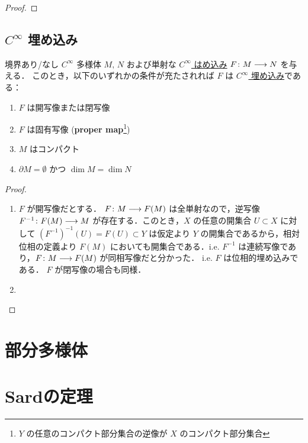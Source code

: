 \documentclass[TQFT_main]{subfiles}
\begin{document}
\begin{proof}
    
\end{proof}

\subsection{$C^\infty$ 埋め込み}

\begin{myprop}[label=prop:embedding-basic]{}
    境界あり/なし $C^\infty$ 多様体 $M,\, N$ および単射な \hyperref[def:submersion-smooth]{$C^\infty$ はめ込み} $F \colon M \longrightarrow N$ を与える．
    このとき，以下のいずれかの条件が充たされれば $F$ は \hyperref[def:submersion-smooth]{$C^\infty$ 埋め込み}である：
    \begin{enumerate}
        \item $F$ は開写像または閉写像
        \item $F$ は固有写像 (\textbf{proper map}\footnote{$Y$ の任意のコンパクト部分集合の逆像が $X$ のコンパクト部分集合})
        \item $M$ はコンパクト
        \item $\partial M = \emptyset$ かつ $\dim M = \dim N$
    \end{enumerate}
    
\end{myprop}

\begin{proof}
    \begin{enumerate}
        \item $F$ が開写像だとする．
        $F \colon M \longrightarrow F(M)$ は全単射なので，逆写像 $F^{-1} \colon F(M) \longrightarrow M$ が存在する．このとき，$X$ の任意の開集合 $U \subset X$ に対して $(F^{-1})^{-1}(U) = F(U) \subset Y$ は仮定より $Y$ の開集合であるから，相対位相の定義より $F(M)$ においても開集合である．i.e. $F^{-1}$ は連続写像であり，$F \colon M \longrightarrow F(M)$ が同相写像だと分かった．
        i.e. $F$ は位相的埋め込みである．
        $F$ が閉写像の場合も同様．
        \item 
    \end{enumerate}
    
\end{proof}


\section{部分多様体}
\section{Sardの定理}
\end{document}
